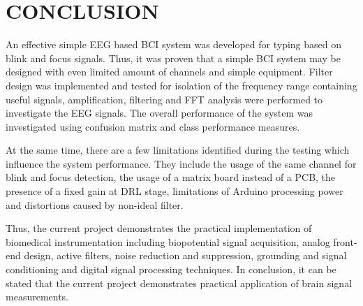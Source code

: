 \chapter{CONCLUSION}
An effective simple EEG based BCI system was developed for typing based on blink and focus signals. Thus, it was proven that a simple BCI system may be designed with even limited amount of channels and simple equipment. Filter design was implemented and tested for isolation of the frequency range containing useful signals, amplification, filtering and FFT analysis were performed to investigate the EEG signals. The overall performance of the system was investigated using confusion matrix and class performance measures.

At the same time, there are a few limitations identified during the testing which influence the system performance. They include the usage of the same channel for blink and focus detection, the usage of a matrix board instead of a PCB, the presence of a fixed gain at DRL stage, limitations of Arduino processing power and distortions caused by non-ideal filter.

Thus, the current project demonstrates the practical implementation of biomedical instrumentation including biopotential signal acquisition, analog front-end design, active filters, noise reduction and suppression, grounding and signal conditioning and digital signal processing techniques. In conclusion, it can be stated that the current project demonstrates practical application of brain signal measurements.